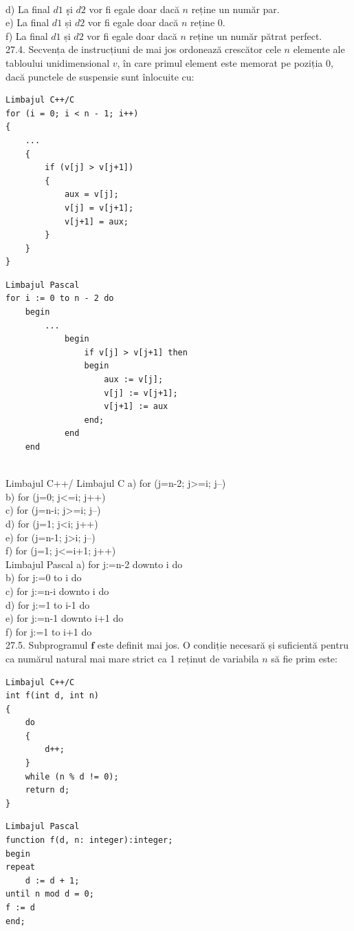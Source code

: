 \\
d) La final $d1$ ș̦i $d2$ vor fi egale doar dacă $n$ reține un număr par.
\\
e) La final $d1$ și $d2$ vor fi egale doar dacă $n$ reține 0.
\\
f) La final $d1$ și $d2$ vor fi egale doar dacă $n$ reține un număr pătrat perfect.
\\
27.4. Secvența de instrucțiuni de mai jos ordonează crescător cele $n$ elemente ale tabloului unidimensional $v$, în care primul element este memorat pe poziția 0, dacă punctele de suspensie sunt înlocuite cu:
\begin{verbatim}
Limbajul C++/C
for (i = 0; i < n - 1; i++)
{
    ...
    {
        if (v[j] > v[j+1])
        {
            aux = v[j];
            v[j] = v[j+1];
            v[j+1] = aux;
        }
    }
}
\end{verbatim}
\begin{verbatim}
Limbajul Pascal
for i := 0 to n - 2 do
    begin
        ...
            begin
                if v[j] > v[j+1] then
                begin
                    aux := v[j];
                    v[j] := v[j+1];
                    v[j+1] := aux
                end;
            end
    end
\end{verbatim}
\\
Limbajul C++/ Limbajul C
a) for (j=n-2; j>=i; j--)
\\
b) for (j=0; j<=i; j++)
\\
c) for (j=n-i; j>=i; j--)
\\
d) for (j=1; j<i; j++)
\\
e) for (j=n-1; j>i; j--)
\\
f) for (j=1; j<=i+1; j++)
\\
Limbajul Pascal
a) for j:=n-2 downto i do
\\
b) for j:=0 to i do
\\
c) for j:=n-i downto i do
\\
d) for j:=1 to i-1 do
\\
e) for j:=n-1 downto i+1 do
\\
f) for j:=1 to i+1 do
\\
27.5. Subprogramul $\mathbf{f}$ este definit mai jos. O condiție necesară și suficientă pentru ca numărul natural mai mare strict ca 1 reținut de variabila $n$ să fie prim este:
\begin{verbatim}
Limbajul C++/C
int f(int d, int n)
{
    do
    {
        d++;
    }
    while (n % d != 0);
    return d;
}
\end{verbatim}
\begin{verbatim}
Limbajul Pascal
function f(d, n: integer):integer;
begin
repeat
    d := d + 1;
until n mod d = 0;
f := d
end;
\end{verbatim}
